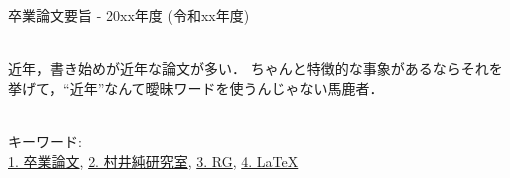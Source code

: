 卒業論文要旨 - 20xx年度 (令和xx年度)
\begin{center}
\begin{large}
\end{large}
\end{center}

~ \\

近年，書き始めが近年な論文が多い．
ちゃんと特徴的な事象があるならそれを挙げて，``近年''なんて曖昧ワードを使うんじゃない馬鹿者．

~ \\
キーワード:\\
\underline{1. 卒業論文},
\underline{2. 村井純研究室},
\underline{3. RG},
\underline{4. LaTeX}
\begin{flushright}
\dept \\
\author
\end{flushright}
